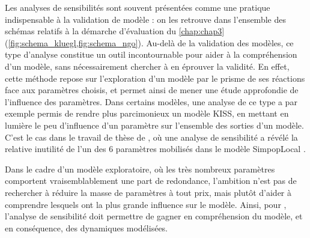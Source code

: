 Les analyses de sensibilités sont souvent présentées comme une pratique indispensable à la validation de modèle : on les retrouve dans l'ensemble des schémas relatifs à la démarche d'évaluation du \cref{chap:chap3} (\cref{fig:schema_kluegl,fig:schema_ngo}).
Au-delà de la validation des modèles, ce type d'analyse constitue un outil incontournable pour aider à la compréhension d'un modèle, sans nécessairement chercher à en éprouver la validité.
En effet, cette méthode repose sur l'exploration d'un modèle par le prisme de ses réactions face aux paramètres choisis, et permet ainsi de mener une étude approfondie de l'influence des paramètres.
Dans certains modèles, une analyse de ce type a par exemple permis de rendre plus parcimonieux un modèle KISS, en mettant en lumière le peu d'influence d'un paramètre sur l'ensemble des sorties d'un modèle.
C'est le cas dans le travail de thèse de , où une analyse de sensibilité a révélé la relative inutilité de l'un des 6 paramètres mobilisés dans le modèle SimpopLocal \autocite[224-225]{schmitt_modelisation_2014}.

Dans le cadre d'un modèle exploratoire, où les très nombreux paramètres comportent vraisemblablement une part de redondance, l'ambition n'est pas de rechercher à réduire la masse de paramètres à tout prix, mais plutôt d'aider à comprendre lesquels ont la plus grande influence sur le modèle.
Ainsi, pour \simfeodal{}, l'analyse de sensibilité doit permettre de gagner en compréhension du modèle, et en conséquence, des dynamiques modélisées.


